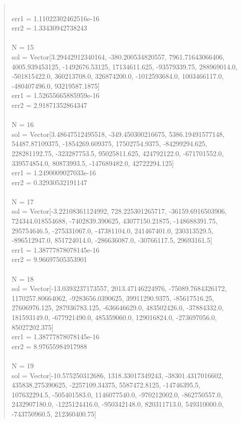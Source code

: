 \documentclass[letterpaper,12pt]{article}
\begin{document}
\begin{quote}
\\err1 = 1.11022302462516e-16
\\err2 = 1.33430942738243
\\
\\N = 15
\\sol = Vector[3.29442912340164, -380.200534820557, 7961.71643066406, 4005.939453125, -1492676.53125, 17134611.625, -93579339.75, 288969014.0, -501815422.0, 360213708.0, 326874200.0, -1012593684.0, 1003466117.0, -480407496.0, 93219587.1875]
\\err1 = 1.52655665885959e-16
\\err2 = 2.91871352864347
\\
\\N = 16
\\sol = Vector[3.48647512495518, -349.450300216675, 5386.19491577148, 54487.87109375, -1854269.609375, 17502754.9375, -84299294.625, 228281192.75, -323287753.5, 95025811.625, 424792122.0, -671701552.0, 339574854.0, 80873993.5, -147689482.0, 42722294.125]
\\err1 = 1.2490009027033e-16
\\err2 = 0.32930532191147
\\
\\N = 17
\\sol = Vector[-3.22108361124992, 728.225301265717, -36159.6916503906, 724344.018554688, -7402839.390625, 43077150.21875, -148688391.75, 295754646.5, -275331067.0, -47381104.0, 241467401.0, 230313529.5, -896512947.0, 851724014.0, -286636087.0, -30766117.5, 29693161.5]
\\err1 = 1.38777878078145e-16
\\err2 = 9.96697505353901
\\
\\N = 18
\\sol = Vector[-13.0393237173557, 2013.47146224976, -75089.7684326172, 1170257.80664062, -9283656.0390625, 39911290.9375, -85617516.25, 27606976.125, 287936783.125, -636646629.0, 483502426.0, -37884332.0, 181593149.0, -677921490.0, 485359060.0, 129016824.0, -273697056.0, 85027202.375]
\\err1 = 1.38777878078145e-16
\\err2 = 8.97655984917988
\\
\\N = 19
\\sol = Vector[-10.575250312686, 1318.33017349243, -38301.4317016602, 435838.275390625, -2257109.34375, 5587472.8125, -14746395.5, 107632294.5, -505401583.0, 1146077540.0, -970212002.0, -862750557.0, 2432907180.0, -1225124416.0, -950342148.0, 820311713.0, 549310000.0, -743750960.5, 212360400.75]

\end{quote}
\end{document}
